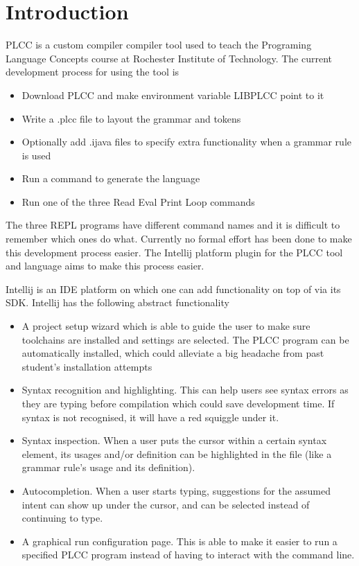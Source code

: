 \documentclass[conference, letterpaper]{IEEEtran}
\begin{document}
\section{Introduction}\label{sec:introduction}
PLCC\cite{plcc-paper} is a custom compiler compiler tool used to teach the Programing Language Concepts course at Rochester Institute of Technology.
The current development process for using the tool is
\begin{itemize}
    \item Download PLCC and make environment variable LIBPLCC point to it
    \item Write a .plcc file to layout the grammar and tokens
    \item Optionally add .ijava files to specify extra functionality when a grammar rule is used
    \item Run a command to generate the language
    \item Run one of the three Read Eval Print Loop commands
\end{itemize}
The three REPL programs have different command names and it is difficult to remember which ones do what.
Currently no formal effort has been done to make this development process easier.
The Intellij platform plugin for the PLCC tool and language aims to make this process easier.
\par Intellij is an IDE platform on which one can add functionality on top of via its SDK\@.
Intellij has the following abstract functionality
\begin{itemize}
    \item A project setup wizard which is able to guide the user to make sure toolchains are installed and settings are selected.
    The PLCC program can be automatically installed, which could alleviate a big headache from past student's installation attempts
    \item Syntax recognition and highlighting.
    This can help users see syntax errors as they are typing before compilation which could save development time.
    If syntax is not recognised, it will have a red squiggle under it.
    \item Syntax inspection.
    When a user puts the cursor within a certain syntax element, its usages and/or definition can be highlighted in the file (like a grammar rule's usage and its definition).
    \item Autocompletion.
    When a user starts typing, suggestions for the assumed intent can show up under the cursor, and can be selected instead of continuing to type.
    \item A graphical run configuration page.
    This is able to make it easier to run a specified PLCC program instead of having to interact with the command line.
\end{itemize}
\end{document}
